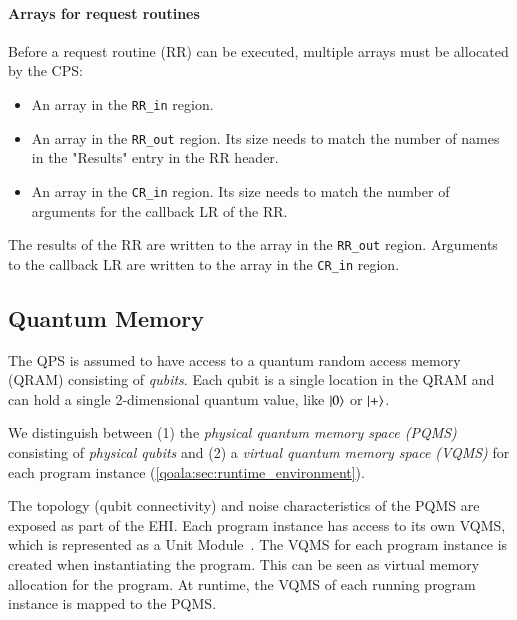 \paragraph{Arrays for request routines}
Before a request routine (RR) can be executed, multiple arrays must be allocated by the CPS:
\begin{itemize}
\item An array in the \texttt{RR\_in} region. 
\item An array in the \texttt{RR\_out} region. Its size needs to match the number of names in the "Results" entry in the RR header.
\item An array in the \texttt{CR\_in} region. Its size needs to match the number of arguments for the callback LR of the RR.
\end{itemize}

The results of the RR are written to the array in the \mbox{\texttt{RR\_out}} region. Arguments to the callback LR are written to the array in the \texttt{CR\_in} region.



\subsection{Quantum Memory}
\label{qoala:sec:app:quantum_memory}
The QPS is assumed to have access to a quantum random access memory (QRAM) consisting of \textit{qubits}.
Each qubit is a single location in the QRAM and can hold a single 2-dimensional quantum value, like $\ket{0}$ or $\ket{+}$.

We distinguish between (1) the \textit{physical quantum memory space (PQMS)} consisting of \textit{physical qubits}
and (2) a \textit{virtual quantum memory space (VQMS)} for each program instance (\cref{qoala:sec:runtime_environment}).

The topology (qubit connectivity) and noise characteristics of the PQMS are exposed as part of the EHI.
Each program instance has access to its own VQMS, which is represented as a Unit Module~\cite{dahlberg2022netqasm}.
The VQMS for each program instance is created when instantiating the program.
This can be seen as virtual memory allocation for the program.
At runtime, the VQMS of each running program instance is mapped to the PQMS.

